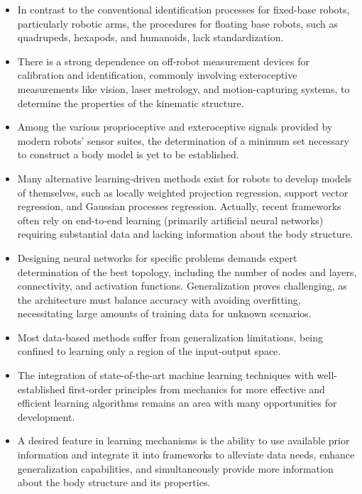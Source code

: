 \documentclass[12pt, a4paper]{article}
\begin{document}
\begin{enumerate}
\begin{itemize}
\item In contrast to the conventional identification processes for fixed-base robots, particularly robotic arms, the procedures for floating base robots, such as quadrupeds, hexapods, and humanoids, lack standardization.

\item There is a strong dependence on off-robot measurement devices for calibration and identification, commonly involving exteroceptive measurements like vision, laser metrology, and motion-capturing systems, to determine the properties of the kinematic structure.

\item Among the various proprioceptive and exteroceptive signals provided by modern robots' sensor suites, the determination of a minimum set necessary to construct a body model is yet to be established.

\item Many alternative learning-driven methods exist for robots to develop models of themselves, such as locally weighted projection regression, support vector regression, and Gaussian processes regression. Actually, recent frameworks often rely on end-to-end learning (primarily artificial neural networks) requiring substantial data and lacking information about the body structure.

\item Designing neural networks for specific problems demands expert determination of the best topology, including the number of nodes and layers, connectivity, and activation functions. Generalization proves challenging, as the architecture must balance accuracy with avoiding overfitting, necessitating large amounts of training data for unknown scenarios.

\item Most data-based methods suffer from generalization limitations, being confined to learning only a region of the input-output space.

\item The integration of state-of-the-art machine learning techniques with well-established first-order principles from mechanics for more effective and efficient learning algorithms remains an area with many opportunities for development.

\item A desired feature in learning mechanisms is the ability to use available prior information and integrate it into frameworks to alleviate data needs, enhance generalization capabilities, and simultaneously provide more information about the body structure and its properties.


\end{itemize}
\end{enumerate}
\end{document}
